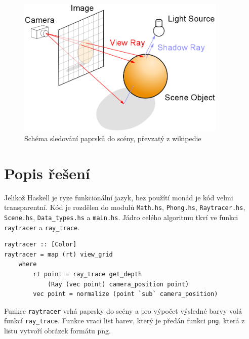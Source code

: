 \documentclass[a4paper, 12pt]{article}
\begin{document}


\begin{figure}[htb]
  \centering
  \includegraphics[width=10cm,keepaspectratio]{Ray_trace_diagram.png}
  \caption{Schéma sledování paprsků do scény, převzatý z wikipedie \cite{wikipedia}}
  \label{fig:raytrace}
\end{figure}


\section{Popis řešení}

Jelikož Haskell je ryze funkcionální jazyk, bez použítí monád je kód velmi transparentní. Kód je rozdělen do modulů
\texttt{Math.hs}, \texttt{Phong.hs}, \texttt{Raytracer.hs}, \texttt{Scene.hs}, \texttt{Data_types.hs} a \texttt{main.hs}. 
Jádro celého algoritmu tkví ve funkci \texttt{raytracer} a \texttt{ray\_trace}. 

\begin{verbatim}
raytracer :: [Color]
raytracer = map (rt) view_grid
    where
        rt point = ray_trace get_depth 
            (Ray (vec point) camera_position point)
        vec point = normalize (point `sub` camera_position)
\end{verbatim}

Funkce \texttt{raytracer} vrhá paprsky do scény a pro výpočet výsledné barvy volá funkcí \texttt{ray\_trace}. Funkce vrací list barev,
který je předán funkci \texttt{png}, která z listu vytvoří obrázek formátu png.
\end{document}
